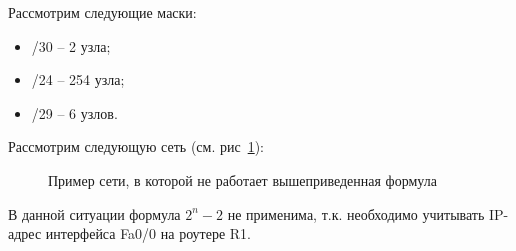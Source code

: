 \begin{exmp}
Рассмотрим следующие маски:
\begin{itemize}
	\item /30 -- 2 узла;
	\item /24 -- 254 узла;
	\item /29 -- 6 узлов.	
\end{itemize}
\end{exmp}
\begin{exmp}
Рассмотрим следующую сеть (см. рис~\ref{fig:ip_maxhostcount_exmp}):
\begin{figure}[h!]
	\centering
	\caption{Пример сети, в которой не работает вышеприведенная формула}
	\label{fig:ip_maxhostcount_exmp}
\end{figure}

В данной ситуации формула $2^n-2$ не применима, т.к. необходимо учитывать IP-адрес интерфейса Fa0/0 на роутере R1.
\end{exmp}
